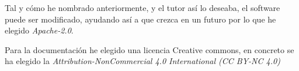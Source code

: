 
Tal y cómo he nombrado anteriormente, y el tutor así lo deseaba, el software puede ser modificado, ayudando así a que crezca en un futuro
por lo que he elegido \emph{Apache-2.0}. 


Para la documentación he elegido una licencia Creative commons, en concreto se ha elegido la \emph{Attribution-NonCommercial 4.0 International (CC BY-NC 4.0)}






